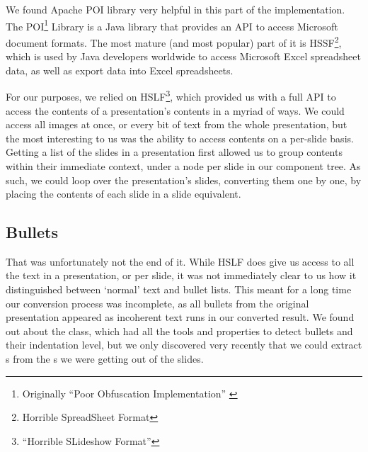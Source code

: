    We found Apache POI library very helpful in this part of the implementation.
   The POI\footnote{Originally ``Poor Obfuscation Implementation''
   \citep{sundaram-1}} Library is a Java library that provides an API to access
   Microsoft document formats. The most mature (and most popular) part of it is
   HSSF\footnote{Horrible SpreadSheet Format}, which is used by Java developers
   worldwide to access Microsoft Excel spreadsheet data, as well as export data
   into Excel spreadsheets.

   For our purposes, we relied on HSLF\footnote{``Horrible SLideshow Format''},
   which provided us with a full API to access the contents of a \ppt
   presentation's contents in a myriad of ways. We could access all images at
   once, or every bit of text from the whole presentation, but the most
   interesting to us was the ability to access contents on a per-slide basis.
   Getting a list of the slides in a presentation first allowed us to group
   contents within their immediate context, under a node per slide in our
   component tree. As such, we could loop over the presentation's slides,
   converting them one by one, by placing the contents of each slide in a \mxp
   slide equivalent.

   \subsection{Bullets}

    That was unfortunately not the end of it. While HSLF does give us access to
    all the text in a presentation, or per slide, it was not immediately clear
    to us how it distinguished between `normal' text and bullet lists. This
    meant for a long time our conversion process was incomplete, as all bullets
    from the original \ppt presentation appeared as incoherent text runs in our
    converted result. We found out about the  class, which
    had all the tools and properties to detect bullets and their indentation
    level, but we only discovered very recently that we could extract
    s from the s we were getting out of the
    slides.

